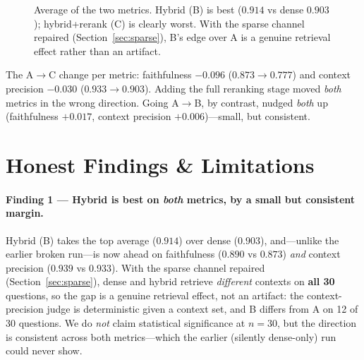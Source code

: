 \documentclass[11pt,a4paper,oneside]{report}
\newcommand{\fitwidth}[1]{\resizebox{\ifdim\width>\linewidth \linewidth\else \width\fi}{!}{#1}}
\begin{document}
\begin{figure}[htbp]
\centering
\fitwidth{%
\begin{tikzpicture}
\begin{axis}[
  width=12.5cm, height=4.6cm, ybar, bar width=22pt,
  ymin=0.80, ymax=0.92, ylabel={Average score},
  symbolic x coords={A,B,C}, xtick=data,
  xticklabels={Dense (A), Hybrid (B), Hybrid+Rerank (C)},
  nodes near coords, nodes near coords style={font=\small, /pgf/number format/fixed, /pgf/number format/precision=3},
  enlarge x limits=0.3, ymajorgrids, tick label style={font=\small},
]
\addplot[fill=amber, draw=amberdark] coordinates {(A,0.903)(B,0.914)(C,0.840)};
\end{axis}
\end{tikzpicture}
}%
\caption{Average of the two metrics. Hybrid (B) is best ($0.914$ vs dense $0.903$); hybrid+rerank (C)
is clearly worst. With the sparse channel repaired (Section~\ref{sec:sparse}), B's edge over A is a
genuine retrieval effect rather than an artifact.}
\label{fig:avg}
\end{figure}

The A$\to$C change per metric: faithfulness \textbf{$-0.096$} ($0.873 \to 0.777$) and context precision
\textbf{$-0.030$} ($0.933 \to 0.903$). Adding the full reranking stage moved \emph{both} metrics in the
wrong direction. Going A$\to$B, by contrast, nudged \emph{both} up (faithfulness $+0.017$, context
precision $+0.006$)---small, but consistent.

\section{Honest Findings \& Limitations}
\label{sec:findings}
\paragraph{Finding 1 --- Hybrid is best on \emph{both} metrics, by a small but consistent margin.}
Hybrid (B) takes the top average ($0.914$) over dense ($0.903$), and---unlike the earlier broken
run---is now ahead on faithfulness ($0.890$ vs $0.873$) \emph{and} context precision ($0.939$ vs
$0.933$). With the sparse channel repaired (Section~\ref{sec:sparse}), dense and hybrid retrieve
\emph{different} contexts on \textbf{all 30} questions, so the gap is a genuine retrieval effect, not an
artifact: the context-precision judge is deterministic given a context set, and B differs from A on 12
of 30 questions. We do \emph{not} claim statistical significance at $n=30$, but the direction is
consistent across both metrics---which the earlier (silently dense-only) run could never show.
\end{document}
